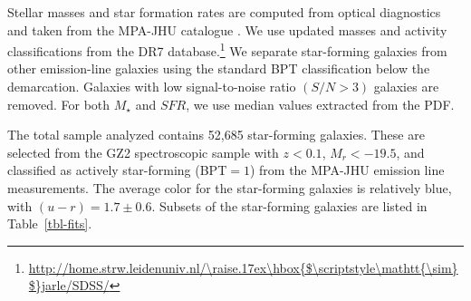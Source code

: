 \documentclass{emulateapj}
\newcommand{\mytilde}{\raise.17ex\hbox{$\scriptstyle\mathtt{\sim}$}}
\begin{document}
Stellar masses and star formation rates are computed from optical diagnostics and taken from the MPA-JHU catalogue \citep{kau03a,bri04}. We use updated masses and activity classifications from the DR7 database.\footnote{\url{http://home.strw.leidenuniv.nl/\mytilde jarle/SDSS/}} We separate star-forming galaxies from other emission-line galaxies using the standard BPT classification \citep{bal81} below the \citet{kau03} demarcation. Galaxies with low signal-to-noise ratio $(S/N > 3)$ galaxies are removed. For both $M_\star$ and $SFR$, we use median values extracted from the PDF.

The total sample analyzed contains 52,685 star-forming galaxies. These are selected from the GZ2 spectroscopic sample with $z<0.1$, $M_r<-19.5$, and classified as actively star-forming (BPT$=1$) from the MPA-JHU emission line measurements. The average color for the star-forming galaxies is relatively blue, with $(u-r)=1.7\pm0.6$.  Subsets of the star-forming galaxies are listed in Table~\ref{tbl-fits}.
\end{document}

